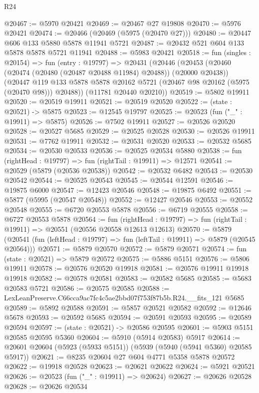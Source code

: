 \begin{lexlean}{R24}
\begin{coremodule}
@20467 := @5970 @20421
@20469 := @20467 @27 @19808
@20470 := @5976 @20421
@20474 := @20466 (@20469 (@5975 (@20470 @27)))
@20480 := @20447 @606 @133 @5880 @5878 @11941 @5721
@20487 := @20432 @521 @604 @133 @5878 @5878 @5721 @11941
@20488 := @5983 @20421
@20518 := fun (singles : @20154) =>
  fun (entry : @19797) =>
  @20431
    (@20446
      (@20453
        (@20460 (@20474 (@20480 (@20487 @20488 @11984) @20488)) (@20000 @20438))
        (@20447 @119 @133 @5878 @5878 @20162 @5721 (@20467 @98 @20162 (@5975 (@20470 @98))) @20488))
      (@11781 @20440 @20210))
@20519 := @5802 @19911
@20520 := @20519 @19911
@20521 := @20519 @20520
@20522 := (state : @20521) -> @5875
@20523 := @12545 @19797
@20525 := @20523 (fun ("_" : @19911) => @5875)
@20526 := @7502 @19911
@20527 := @20526 @20520
@20528 := @20527 @5685
@20529 := @20525 @20528
@20530 := @20526 @19911
@20531 := @7762 @19911
@20532 := @20531 @20520
@20533 := @20532 @5685
@20534 := @20530 @20533
@20536 := @20525 @20534 @5880
@20538 := fun (rightHead : @19797) => fun (rightTail : @19911) => @12571
@20541 := @20529 (@5879 (@20536 @20538))
@20542 := @20532 @6482
@20543 := @20530 @20542
@20544 := @20525 @20543
@20545 := @20544 @12591
@20546 := @19875 @6000
@20547 := @12423 @20546
@20548 := @19875 @6492
@20551 := @5877 (@5995 (@20547 @20548))
@20552 := @12427 @20546
@20553 := @20552 @20548
@20555 := @6720 @20553 @5878
@20556 := @6719 @20555
@20558 := @6727 @20553 @5878
@20564 := fun (rightHead : @19797) =>
  fun (rightTail : @19911) => @20551 (@20556 @20558 @12613 @12613)
@20570 := @5879
    (@20541 (fun (leftHead : @19797) => fun (leftTail : @19911) => @5879 (@20545 @20564)))
@20571 := @5879 @20570
@20572 := @5879 @20571
@20574 := fun (state : @20521) => @5879 @20572
@20575 := @5886 @5151
@20576 := @5806 @19911
@20578 := @20576 @20520 @19918
@20581 := @20576 @19911 @19918 @19918
@20582 := @20578 @20581
@20583 := @20582 @5685
@20585 := @5683 @20583 @5721
@20586 := @20575 @20585
@20588 := LexLeanPreserve.C66cca9ac7fc4c5ae2bbd07f753f87b5b.R24.__fits_121 @5685
@20589 := @5892 @20588
@20591 := @5857 @20521 @20582
@20592 := @12646 @5678
@20593 := @20592 @5685
@20594 := @20591 @20593
@20595 := @20589 @20594
@20597 := (state : @20521) -> @20586 @20595
@20601 := @5903 @5151 @20585 @20595 @5360
@20604 := @5910 (@5914 @20583) @5917
@20614 := @20601 @20604 (@5923 (@5933 @5151)) (@5939 (@5940 (@5941 @5360) @20585 @5917))
@20621 := @8235 @20604 @27 @604 @4771 @5358 @5878 @20572
@20622 := @19918 @20528
@20623 := @20621 @20622
@20624 := @5921 @20521
@20626 := @20523 (fun ("_" : @19911) => @20624)
@20627 := @20626 @20528
@20628 := @20626 @20534

\end{coremodule}
\end{lexlean}

